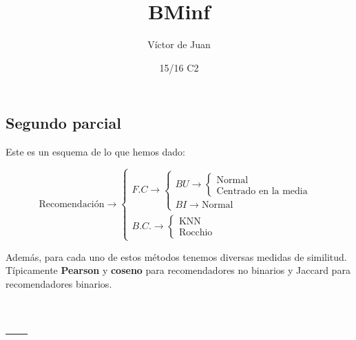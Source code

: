 \documentclass[palatino,nochap]{apuntes}
\title{BMinf}
\author{Víctor de Juan}
\date{15/16 C2}
\begin{document}
\pagestyle{plain}
\maketitle
\tableofcontents
\newpage

\section{Segundo parcial}

Este es un esquema de lo que hemos dado:


\[
\text{Recomendación} \to 
	\left\{
		\begin{array}{l}
		F.C \to
			\left\{ 
				\begin{array}{l}
					BU \to\left\{ 
						\begin{array}{l}
							\text{Normal}\\
							\text{Centrado en la media}
						\end{array}\right.\\
					BI \to \text{Normal}
				\end{array}\right.\\
		B.C. \to\left\{
			\begin{array}{l}
				\text{KNN}\\
				\text{Rocchio}
			\end{array}\right.
		\end{array}
	\right.
\]


Además, para cada uno de estos métodos tenemos diversas medidas de similitud. Típicamente \textbf{Pearson} y \textbf{coseno} para recomendadores no binarios y Jaccard para recomendadores binarios.


\appendix

\chapter{---}

\printindex
\end{document}
